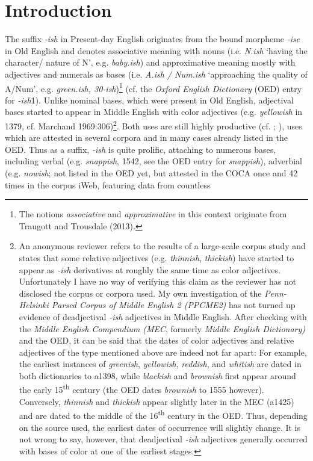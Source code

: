 \documentclass[output=paper
,modfonts
,nonflat]{langsci/langscibook}
\author{Tabea Harris\affiliation{University of Mannheim}}
\begin{document}
\maketitle
{}
\section{Introduction} 
The suffix \textit{-ish} in Present-day English originates from the bound morpheme \textit{-isc} in Old English and denotes associative meaning with nouns (i.e. \textit{N.ish} `having the character/ nature of N', e.g. \textit{baby.ish}) and approximative meaning mostly with adjectives and numerals as bases (i.e. \textit{A.ish / Num.ish} `approaching the quality of A/Num', e.g. \textit{green.ish, 30-ish})\footnote{The notions \textit{associative} and \textit{approximative} in this context originate from Traugott and Trousdale (2013).} (cf. the \textit{Oxford English Dictionary} (OED) entry for \textit{-ish}1). Unlike nominal bases, which were present in Old English, adjectival bases started to appear in Middle English with color adjectives (e.g. \textit{yellowish} in 1379, cf. Marchand 1969:306)\footnote{An anonymous reviewer refers to the results of a large-scale corpus study and states that some relative adjectives (e.g. \textit{thinnish}, \textit{thickish}) have started to appear as \textit{-ish} derivatives at roughly the same time as color adjectives. Unfortunately I have no way of verifying this claim as the reviewer has not disclosed the corpus or corpora used. My own investigation of the \textit{Penn-Helsinki Parsed Corpus of Middle English 2 (PPCME2)} has not turned up evidence of deadjectival \textit{-ish} adjectives in Middle English. After checking with the \textit{Middle English Compendium (MEC}, formerly \textit{Middle English Dictionary)} and the OED, it can be said that the dates of color adjectives and relative adjectives of the type mentioned above are indeed not far apart: For example, the earliest instances of \textit{greenish}, \textit{yellowish}, \textit{reddish}, and \textit{whitish} are dated in both dictionaries to a1398, while \textit{blackish} and \textit{brownish} first appear around the early 15\textsuperscript{th} century (the OED dates \textit{brownish} to 1555 however). Conversely, \textit{thinnish} and \textit{thickish} appear slightly later in the MEC (a1425) and are dated to the middle of the 16\textsuperscript{th} century in the OED. Thus, depending on the source used, the earliest dates of occurrence will slightly change. It is not wrong to say, however, that deadjectival \textit{-ish} adjectives generally occurred with bases of color at one of the earliest stages.}. Both uses are still highly productive (cf. \textcite[305]{Bauer2013}; \textcite[235]{Dixon2014} ), uses which are attested in several corpora and in many cases already listed in the OED. Thus as a suffix,  \textit{-ish} is quite prolific, attaching to numerous bases, including verbal (e.g.  \textit{snappish}, 1542, see the OED entry for \textit{snappish}), adverbial (e.g.  \textit{nowish}; not listed in the OED yet, but attested in the COCA once and 42 times in the corpus iWeb, featuring data from countless 
\end{document}
